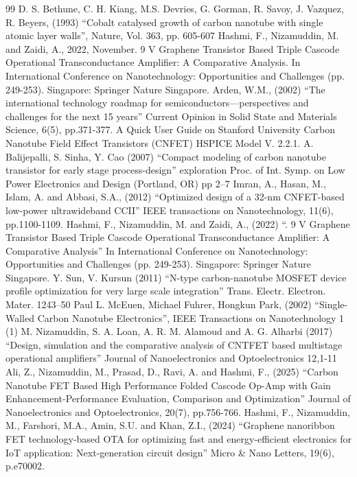 \begin{thebibliography}{99}
   D. S. Bethune, C. H. Kiang, M.S. Devries, G. Gorman, R. Savoy, J. Vazquez, R. Beyers, (1993) “Cobalt catalysed growth of carbon nanotube with single atomic layer walls”, Nature, Vol. 363, pp. 605-607
   Hashmi, F., Nizamuddin, M. and Zaidi, A., 2022, November. 9 V Graphene Transistor Based Triple Cascode Operational Transconductance Amplifier: A Comparative Analysis. In International Conference on Nanotechnology: Opportunities and Challenges (pp. 249-253). Singapore: Springer Nature Singapore.
   Arden, W.M., (2002) “The international technology roadmap for semiconductors—perspectives and challenges for the next 15 years” Current Opinion in Solid State and Materials Science, 6(5), pp.371-377.
   A Quick User Guide on Stanford University Carbon Nanotube Field Effect Transistors (CNFET) HSPICE Model V. 2.2.1.
   A. Balijepalli, S. Sinha, Y. Cao (2007) “Compact modeling of carbon nanotube transistor for early stage process-design” exploration Proc. of Int. Symp. on Low Power Electronics and Design (Portland, OR) pp 2–7
   Imran, A., Hasan, M., Islam, A. and Abbasi, S.A., (2012) “Optimized design of a 32-nm CNFET-based low-power ultrawideband CCII” IEEE transactions on Nanotechnology, 11(6), pp.1100-1109.
   Hashmi, F., Nizamuddin, M. and Zaidi, A., (2022) “. 9 V Graphene Transistor Based Triple Cascode Operational Transconductance Amplifier: A Comparative Analysis” In International Conference on Nanotechnology: Opportunities and Challenges (pp. 249-253). Singapore: Springer Nature Singapore.
   Y. Sun, V.  Kursun (2011) “N-type carbon-nanotube MOSFET device profile optimization for very large scale integration” Trans. Electr. Electron. Mater. 1243–50
   Paul L. McEuen, Michael Fuhrer, Hongkun Park, (2002) “Single-Walled Carbon Nanotube Electronics”, IEEE Transactions on Nanotechnology 1 (1)
   M. Nizamuddin, S. A. Loan, A. R. M. Alamoud and A. G. Alharbi (2017) “Design, simulation and the comparative analysis of CNTFET based multistage operational amplifiers” Journal of Nanoelectronics and Optoelectronics 12,1-11
   Ali, Z., Nizamuddin, M., Prasad, D., Ravi, A. and Hashmi, F., (2025) “Carbon Nanotube FET Based High Performance Folded Cascode Op-Amp with Gain Enhancement-Performance Evaluation, Comparison and Optimization” Journal of Nanoelectronics and Optoelectronics, 20(7), pp.756-766.
   Hashmi, F., Nizamuddin, M., Farshori, M.A., Amin, S.U. and Khan, Z.I., (2024) “Graphene nanoribbon FET technology‐based OTA for optimizing fast and energy‐efficient electronics for IoT application: Next‐generation circuit design” Micro \& Nano Letters, 19(6), p.e70002.

\end{thebibliography}
